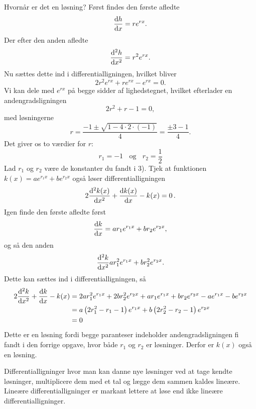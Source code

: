 \begin{opgave}[2]{Hvornår er det en løsning?}
	Først findes den første afledte
$$
\dv{h}{x}=re^{rx}.
$$
Der efter den anden afledte
$$
\dv[2]{h}{x}=r^2e^{rx}.
$$
Nu sættes dette ind i differentialligningen, hvilket bliver
$$
2r^2e^{rx}+re^{rx}-e^{rx}=0.
$$
Vi kan dele med $e^{rx}$ på begge sidder af lighedstegnet, hvilket efterlader en andengradsligningen
$$
2r^2+r-1=0,
$$
med løsningerne
$$
r=\frac{-1\pm\sqrt{1-4\cdot 2\cdot (-1)}}{4}=\frac{\pm 3-1}{4}.
$$
Det giver os to værdier for $r$:
$$r_1=-1~~~~\text{og}~~~~r_2=\frac{1}{2}$$
	\opg Lad $r_1$ og $r_2$ være de konstanter du fandt i 3). Tjek at funktionen $k (x) = ae^{r_1x} + be^{r_2x} $ også løser differentialligningen
	\begin{align*}
	2 \dv[2]{k(x)}{x} + \dv{k(x)}{x} - k(x) = 0 \, .
	\end{align*}
Igen finde den første afledte først
$$
\dv{k}{x}=ar_1e^{r_1x}+br_2e^{r_2x},
$$
og så den anden
$$
\dv[2]{k}{x}ar_1^2e^{r_1x}+br_2^2e^{r_2x}.
$$
Dette kan sættes ind i differentialligningen, så
\begin{align*}
2\dv[2]{k}{x}+\dv{k}{x}-k(x)&=2ar_1^2e^{r_1x}+2br_2^2e^{r_2x}+ar_1e^{r_1x}+br_2e^{r_2x}-ae^{r_1x}-be^{r_2x}\\
&=a\left(2r_1^2-r_1-1\right)e^{r_1x}+b\left(2r_2^2-r_2-1\right)e^{r_2x}\\
&=0
\end{align*}
Dette er en løsning fordi begge paranteser indeholder andengradsligningen fi fandt i den forrige opgave, hvor både $r_1$ og $r_2$ er løsninger. Derfor er $k(x)$ også en løsning.

Differentialligninger hvor man kan danne nye løsninger ved at tage kendte løsninger, multiplicere dem med et tal og lægge dem sammen kaldes lineære. Lineære differentialligninger er markant lettere at løse end ikke lineære differentialligninger.
\end{opgave}

